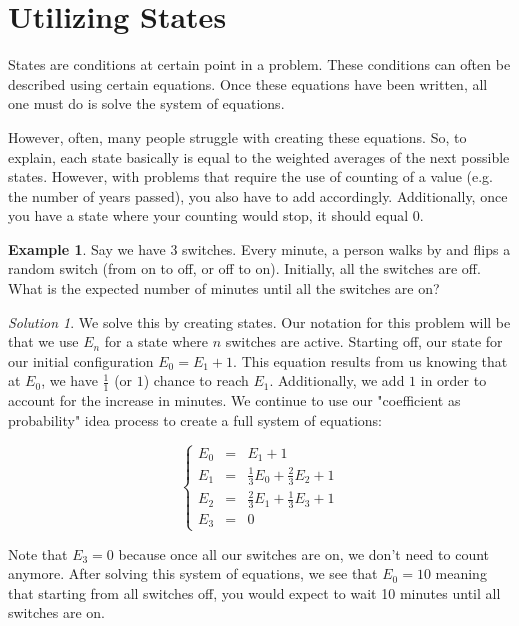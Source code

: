 \documentclass[letterpaper]{article}
\theoremstyle{definition}
\newtheorem{example}[thm]{Example}
\theoremstyle{remark}
\newtheorem*{solution}{Solution}
\theoremstyle{definition}
\begin{document}
\section{Utilizing States}
States are conditions at certain point in a problem. These conditions can often be described using certain equations. Once these equations have been written, all one must do is solve the system of equations.

However, often, many people struggle with creating these equations. So, to explain, each state basically is equal to the weighted averages of the next possible states. However,
with problems that require the use of counting of a value (e.g. the number of years passed), you also have to add accordingly. Additionally, once you have a state where your counting would stop, it should equal 0.

\begin{example}
Say we have 3 switches. Every minute, a person walks by and flips a random switch (from on to off, or off to on). Initially, all the switches are off. What is the expected number of minutes until all the switches are on?
\end{example}

\begin{solution}
We solve this by creating states. Our notation for this problem will be that we use $E_{n}$ for a state where $n$ switches are active. Starting off, our state for our initial configuration $E_{0} = E_{1} + 1$. This equation results from us knowing that at $E_{0}$, we have $\frac{1}{1}$ (or $1$) chance to reach $E_{1}$. Additionally, we add $1$ in order to account for the increase in minutes. We continue to use our "coefficient as probability" idea process to create a full system of equations:

\[ \left\{ 
    \begin{array}{lcl} 
        E_{0} &= &E_{1} + 1\\
        E_{1} &= &\frac{1}{3}E_{0} + \frac{2}{3}E_{2} + 1\\
        E_{2} &= &\frac{2}{3}E_{1} + \frac{1}{3}E_{3} + 1\\
        E_{3} &= &0
\end{array}
\right.\]

Note that $E_{3} = 0$ because once all our switches are on, we don't need to count anymore. After solving this system of equations, we see that $E_{0} = 10$ meaning that starting from all switches off, you would expect to wait 10 minutes until all switches are on. 
\end{solution}
\end{document}
